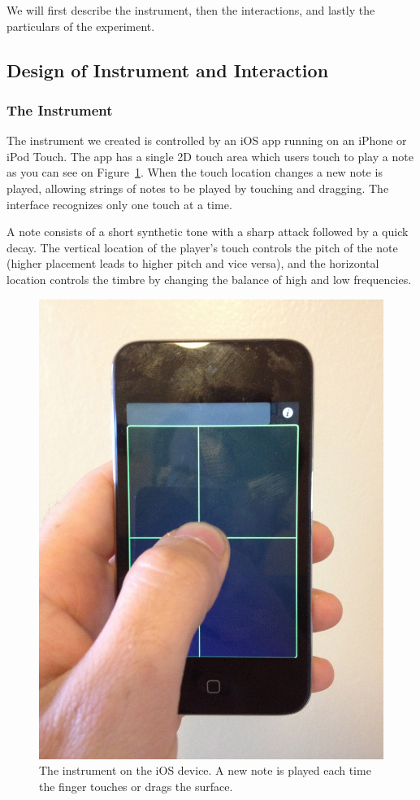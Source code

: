 \documentclass{article}
\begin{document}
We will first describe the instrument, then the interactions, and lastly the particulars of the experiment.


\subsection{Design of Instrument and Interaction}

\subsubsection{The Instrument}

The instrument we created is controlled by an iOS app running on an iPhone or iPod Touch. The app has a single 2D touch area which users touch to play a note as you can see on Figure~\ref{iphone}.
When the touch location changes a new note is played, allowing strings of notes to be played by touching and dragging.  The interface recognizes only one touch at a time.

A note consists of a short synthetic tone with a sharp attack followed by a quick decay.  The vertical location of the player's touch controls the pitch of the note (higher placement leads to higher pitch and vice versa), and the horizontal location controls the timbre by changing the balance of high and low frequencies.

\begin{figure}[tb]
\includegraphics[width=\columnwidth]{iphone.jpg}
\caption{The instrument on the iOS device. A new note is played each time the finger touches or drags the surface.}
\label{iphone}
\end{figure}
\end{document}
